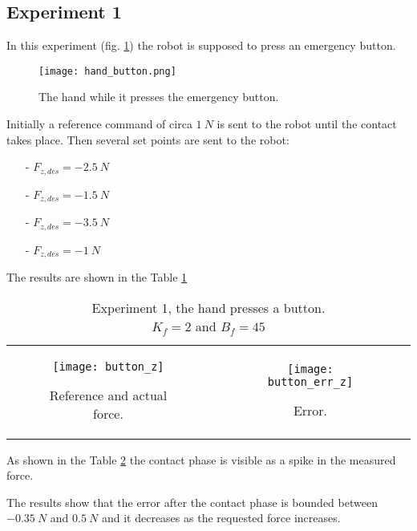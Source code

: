 \subsection{Experiment 1}
In this experiment (fig. \ref{fig:hand_button}) the robot is supposed to press an emergency button.
\begin{figure}[h]
  \centering
  \texttt{[image: hand\_button.png]}
  \caption{The hand while it presses the emergency button. \label{fig:hand_button}}
\end{figure}
\par
Initially a reference command of circa $\SI{1}{N}$ is sent to the robot
until the contact takes place. Then several set points are sent to the robot:
\begin{itemize}
\item[-] $F_{z,des} = \SI{-2.5}{N}$
\item[-] $F_{z,des} =\SI{-1.5}{N}$
\item[-] $F_{z,des} =\SI{-3.5}{N}$
\item[-] $F_{z,des} =\SI{-1}{N}$
\end{itemize}
\par
The results are shown in the Table \ref{fig:button}
\begin{table}[h]
  \begin{tabular}{cc}
    \begin{subfigure}{0.5\textwidth}
      \centering
      \texttt{[image: button\_z]}
      \caption{Reference and actual force. \label{fig:button_z}}
    \end{subfigure}&
    \begin{subfigure}{0.5\textwidth}
      \centering
      \texttt{[image: button\_err\_z]}
      \caption{Error. \label{fig:button_error_z}}
    \end{subfigure} 
  \end{tabular}
  \caption{Experiment 1, the hand presses a button.\\
  $K_f = 2$ and $B_f = 45$\label{fig:button}}
\end{table}
\par
As shown in the Table \ref{fig:button_z} the contact phase is visible as 
a spike in the measured force.
\par
The results show that the error after the contact phase is bounded between
$\SI{-0.35}{N}$ and $\SI{0.5}{N}$ and it decreases as the requested force 
increases.

